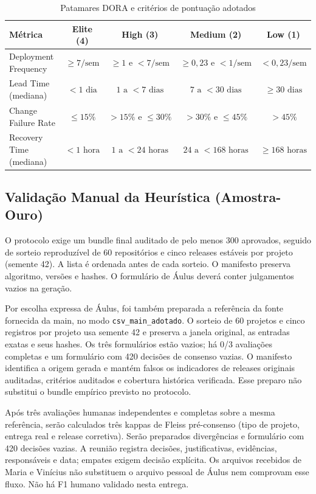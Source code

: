 \documentclass[12pt]{article}
\begin{document}
\begin{table}[ht]
\centering
\caption{Patamares DORA e critérios de pontuação adotados}
\label{tab:cortes_dora}
\small
\begin{tabular}{lcccc}
\toprule
\textbf{Métrica} & \textbf{Elite (4)} & \textbf{High (3)} & \textbf{Medium (2)} & \textbf{Low (1)} \\
\midrule
Deployment Frequency & $\ge 7/\text{sem}$ & $\ge 1\text{ e } < 7/\text{sem}$ & $\ge 0{,}23\text{ e } < 1/\text{sem}$ & $< 0{,}23/\text{sem}$ \\
Lead Time (mediana) & $< 1\text{ dia}$ & $1\text{ a } < 7\text{ dias}$ & $7\text{ a } < 30\text{ dias}$ & $\ge 30\text{ dias}$ \\
Change Failure Rate & $\le 15\%$ & $> 15\%\text{ e } \le 30\%$ & $> 30\%\text{ e } \le 45\%$ & $> 45\%$ \\
Recovery Time (mediana) & $< 1\text{ hora}$ & $1\text{ a } < 24\text{ horas}$ & $24\text{ a } < 168\text{ horas}$ & $\ge 168\text{ horas}$ \\
\bottomrule
\end{tabular}
\end{table}

\subsection{Validação Manual da Heurística (Amostra-Ouro)}
O protocolo exige um bundle final auditado de pelo menos 300 aprovados, seguido de sorteio reproduzível de 60 repositórios e cinco releases estáveis por projeto (semente 42). A lista é ordenada antes de cada sorteio. O manifesto preserva algoritmo, versões e hashes. O formulário de Áulus deverá conter julgamentos vazios na geração.

Por escolha expressa de Áulus, foi também preparada a referência da fonte fornecida da main, no modo \texttt{csv\_main\_adotado}. O sorteio de 60 projetos e cinco registros por projeto usa semente 42 e preserva a janela original, as entradas exatas e seus hashes. Os três formulários estão vazios; há 0/3 avaliações completas e um formulário com 420 decisões de consenso vazias. O manifesto identifica a origem gerada e mantém falsos os indicadores de releases originais auditadas, critérios auditados e cobertura histórica verificada. Esse preparo não substitui o bundle empírico previsto no protocolo.

Após três avaliações humanas independentes e completas sobre a mesma referência, serão calculados três kappas de Fleiss pré-consenso (tipo de projeto, entrega real e release corretiva). Serão preparados divergências e formulário com 420 decisões vazias. A reunião registra decisões, justificativas, evidências, responsáveis e data; empates exigem decisão explícita. Os arquivos recebidos de Maria e Vinícius não substituem o arquivo pessoal de Áulus nem comprovam esse fluxo. Não há F1 humano validado nesta entrega.
\end{document}
